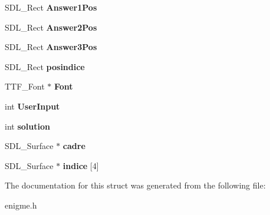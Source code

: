 \begin{DoxyCompactItemize}
\item 
S\+D\+L\+\_\+\+Rect {\bfseries Answer1\+Pos}\hypertarget{structenigme_ab3e3e3413abc9d50abe979aeef1796f3}{}\label{structenigme_ab3e3e3413abc9d50abe979aeef1796f3}

\item 
S\+D\+L\+\_\+\+Rect {\bfseries Answer2\+Pos}\hypertarget{structenigme_a96bff1fb1125ff9af077a9d2f221e5b4}{}\label{structenigme_a96bff1fb1125ff9af077a9d2f221e5b4}

\item 
S\+D\+L\+\_\+\+Rect {\bfseries Answer3\+Pos}\hypertarget{structenigme_a990afa591c349a2c4c259b5f53f113f3}{}\label{structenigme_a990afa591c349a2c4c259b5f53f113f3}

\item 
S\+D\+L\+\_\+\+Rect {\bfseries posindice}\hypertarget{structenigme_abe3ff88d08c8aa65838771f3d79d6ee0}{}\label{structenigme_abe3ff88d08c8aa65838771f3d79d6ee0}

\item 
T\+T\+F\+\_\+\+Font $\ast$ {\bfseries Font}\hypertarget{structenigme_a0df973941cba497db3764544928f51a4}{}\label{structenigme_a0df973941cba497db3764544928f51a4}

\item 
int {\bfseries User\+Input}\hypertarget{structenigme_a2510d72d520e6646e56b1a64814235b3}{}\label{structenigme_a2510d72d520e6646e56b1a64814235b3}

\item 
int {\bfseries solution}\hypertarget{structenigme_ae5fd05940e4cdd677b0ce7497f9ff522}{}\label{structenigme_ae5fd05940e4cdd677b0ce7497f9ff522}

\item 
S\+D\+L\+\_\+\+Surface $\ast$ {\bfseries cadre}\hypertarget{structenigme_a0bbdc2c51c39e3ec8fa0f41742daa180}{}\label{structenigme_a0bbdc2c51c39e3ec8fa0f41742daa180}

\item 
S\+D\+L\+\_\+\+Surface $\ast$ {\bfseries indice} \mbox{[}4\mbox{]}\hypertarget{structenigme_a67f5404e15f16e190b1542eefe642e6d}{}\label{structenigme_a67f5404e15f16e190b1542eefe642e6d}

\end{DoxyCompactItemize}


The documentation for this struct was generated from the following file\+:\begin{DoxyCompactItemize}
\item 
enigme.\+h\end{DoxyCompactItemize}
